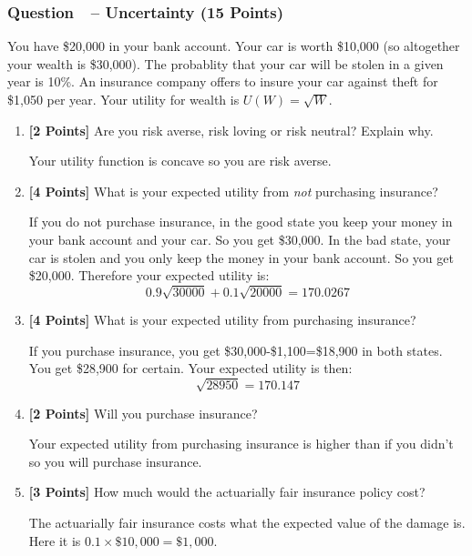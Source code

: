 \documentclass[10pt]{article}
\newcounter{question}[section]
\newcommand{\question}[1]{\refstepcounter{question}
  \subsubsection*{Question~\thequestion~-- #1}}
\newenvironment{subquestions}{
  \begin{enumerate}[label=(\roman*)]}{\end{enumerate}}
\begin{document}
\question{Uncertainty (15 Points)}
You have \$20,000 in your bank account. Your car is worth \$10,000 (so
altogether your wealth is \$30,000).  The probablity that your car will be
stolen in a given year is 10\%. An insurance company offers to insure your car
against theft for \$1,050 per year.  Your utility for wealth is $U\left( W
\right)=\sqrt{W}$.
\begin{subquestions}
  \item \textbf{[2 Points]} Are you risk averse, risk loving or risk neutral? Explain why.

    \textcolor{solution-color}{
      Your utility function is concave so you are risk averse.
    }

  \item \textbf{[4 Points]} What is your expected utility from \emph{not}
      purchasing insurance?

      \textcolor{solution-color}{
      If you do not purchase insurance, in the good state you keep your money
      in your bank account and your car. So you get \$30,000. In the bad state,
      your car is stolen and you only keep the money in your bank account. So
      you get \$20,000.  Therefore your expected utility is:
      \[
        0.9 \sqrt{30000} + 0.1 \sqrt{20000}=170.0267
      \]
    }

  \item \textbf{[4 Points]} What is your expected utility from purchasing
    insurance?

    \textcolor{solution-color}{
      If you purchase insurance, you get \$30,000-\$1,100=\$18,900 in both
      states. You get \$28,900 for certain. Your expected utility is then:
      \[
        \sqrt{28950}=170.147
      \]
    }

  \item \textbf{[2 Points]} Will you purchase insurance?

    \textcolor{solution-color}{
      Your expected utility from purchasing insurance is higher than if you
      didn't so you will purchase insurance.
    }

  \item \textbf{[3 Points]} How much would the actuarially fair insurance
    policy cost?

    \textcolor{solution-color}{
      The actuarially fair insurance costs what the expected value of the
      damage is.  Here it is $0.1 \times \$10,000 = \$ 1,000$.
    }

\end{subquestions}
\end{document}
